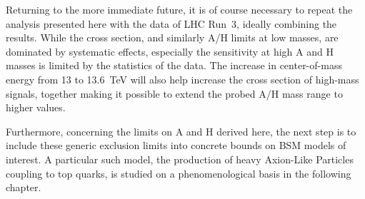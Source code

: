 \smallskip

Returning to the more immediate future, it is of course necessary to repeat the analysis presented here with the data of LHC Run~3, ideally combining the results. While the \etat cross section, and similarly A/H limits at low masses, are dominated by systematic effects, especially the sensitivity at high A and H masses is limited by the statistics of the data. The increase in center-of-mass energy from 13 to \SI{13.6}{\TeV} will also help increase the cross section of high-mass signals, together making it possible to extend the probed A/H mass range to higher values.


Furthermore, concerning the limits on A and H derived here, the next step is to include these generic exclusion limits into concrete bounds on BSM models of interest. A particular such model, the production of heavy Axion-Like Particles coupling to top quarks, is studied on a phenomenological basis in the following chapter.

